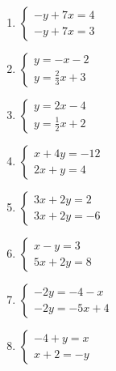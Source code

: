 \documentclass[12pt]{book}
\theoremstyle{definition}
\begin{document}
\begin{multicols}{3}
\begin{enumerate}
  \item
	$\begin{cases}
	- y + 7 x = 4\\
	- y + 7 x = 3
  \end{cases}$
  \item
	$\begin{cases}
	y = - x - 2\\
	y = \frac{2}{3} x + 3
  \end{cases}$
  \item
	$\begin{cases}
	y = 2 x - 4\\
	y = \frac{1}{2} x + 2
  \end{cases}$
  \item
	$\begin{cases}
	x + 4 y = - 12\\
	2 x + y = 4
  \end{cases}$
  \item
	$\begin{cases}
	3 x + 2 y = 2\\
	3 x + 2 y = - 6
  \end{cases}$
  \item
	$\begin{cases}
	x - y = 3\\
	5 x + 2 y = 8
  \end{cases}$
	\item
	$\begin{cases}
	- 2 y = - 4 - x\\
	- 2 y = - 5 x + 4
  \end{cases}$
  \item
	$\begin{cases}
	- 4 + y = x\\
	x + 2 = - y
	\end{cases}$
	\end{enumerate}
\end{multicols}
\newpage
\end{document}
